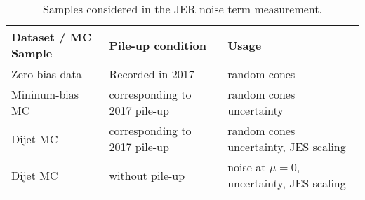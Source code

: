 \begin{table}[t]
    \centering
    \begin{tabular}{l l l }
        \toprule
        Dataset / MC Sample & Pile-up condition             & Usage                                      \\
        \midrule
        Zero-bias data      & Recorded in 2017              & random cones                               \\
        Mininum-bias MC     & corresponding to 2017 pile-up & random cones uncertainty                   \\
        Dijet MC            & corresponding to 2017 pile-up & random cones uncertainty, JES scaling      \\
        Dijet MC            & without pile-up               & noise at $\mu=0$, uncertainty, JES scaling \\
        \bottomrule
    \end{tabular}
    \caption{
        Samples considered in the JER noise term measurement.}
    \label{tab:noise-term-samples}
\end{table}
